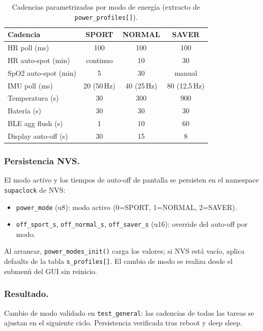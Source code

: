 \documentclass[letterpaper,11pt]{article}
\begin{document}
\begin{table}[H]
    \centering
    \caption{Cadencias parametrizadas por modo de energía (extracto de \texttt{power\_profiles[]}).}
    \label{tab:cadencias}
    \footnotesize
    \begin{tabular}{|l|c|c|c|}
    \hline
    \rowcolor{gray!20}\textbf{Cadencia} & \textbf{SPORT} & \textbf{NORMAL} & \textbf{SAVER} \\\hline
    HR poll (ms)           & 100        & 100         & 100        \\\hline
    HR auto-spot (min)     & continuo   & 10          & 30         \\\hline
    SpO2 auto-spot (min)   & 5          & 30          & manual     \\\hline
    IMU poll (ms)          & 20 (50\,Hz) & 40 (25\,Hz) & 80 (12,5\,Hz) \\\hline
    Temperatura (s)        & 30         & 300         & 900        \\\hline
    Batería (s)            & 30         & 30          & 30         \\\hline
    BLE agg flush (s)      & 1          & 10          & 60         \\\hline
    Display auto-off (s)   & 30         & 15          & 8          \\\hline
    \end{tabular}
\end{table}

\subsubsection{Persistencia NVS.} El modo activo y los tiempos de auto-off de pantalla se
persisten en el namespace \texttt{supaclock} de NVS:
\begin{itemize}
    \item \texttt{power\_mode} (u8): modo activo (0=SPORT, 1=NORMAL, 2=SAVER).
    \item \texttt{off\_sport\_s}, \texttt{off\_normal\_s}, \texttt{off\_saver\_s} (u16): override
    del auto-off por modo.
\end{itemize}
Al arrancar, \texttt{power\_modes\_init()} carga los valores; si NVS está vacío, aplica
defaults de la tabla \texttt{s\_profiles[]}. El cambio de modo se realiza desde el submenú
del GUI sin reinicio.

\subsubsection{Resultado.} Cambio de modo validado en \texttt{test\_general}: las cadencias
de todas las tareas se ajustan en el siguiente ciclo. Persistencia verificada tras reboot
y deep sleep.
\end{document}
